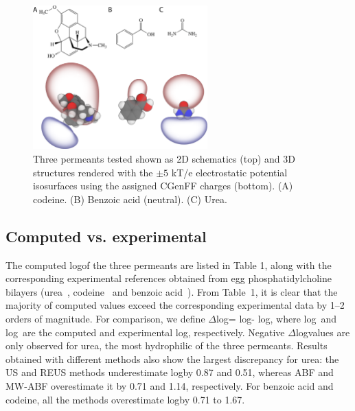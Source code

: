 \begin{figure}[!htbp]
\begin{center}
\includegraphics[width=0.6\textwidth]{Figures/permeants1}
\caption[Structures of permeants urea, codeine, and benzoic acid along with electrostatic potential isosurfaces]{Three permeants tested shown as 2D schematics (top) and 3D structures rendered with the $\pm 5$ kT/e electrostatic potential isosurfaces
using the assigned CGenFF charges (bottom).  (A) codeine.  (B) Benzoic acid (neutral).  (C) Urea.}
\label{fig:permeants}
\end{center}
\end{figure}

\subsection{Computed vs. experimental \perm}
\par The computed log\perm of the three permeants are listed in Table 1, along with the corresponding experimental references obtained from egg phosphatidylcholine bilayers (urea~\cite{Gallucci1971}, codeine~\cite{Orbach1980} and  benzoic acid~\cite{Walter1984}). From Table~1, it is clear that the majority of computed \perm values exceed the corresponding experimental data by 1--2 orders of magnitude. For comparison, we define $\Delta$log\perm = log\permcom - log\permexp, where log\permcom~and log\permexp~are the computed and experimental log\perm, respectively. Negative $\Delta$log\perm values are only observed for urea, the most hydrophilic of the three permeants.  Results obtained with different methods also show the largest discrepancy for urea: the US and REUS  methods underestimate log\perm by 0.87 and 0.51, whereas ABF and MW-ABF overestimate it by 0.71 and 1.14, respectively. For benzoic acid and codeine, all the methods overestimate log\perm by 0.71 to 1.67.


